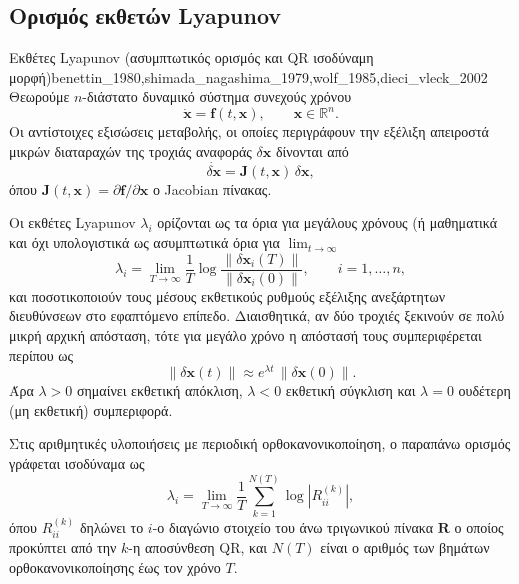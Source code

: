 \documentclass[11pt,a4paper]{report}
\begin{document}
\subsection{Ορισμός εκθετών Lyapunov}

\begin{definitionbox}{Εκθέτες Lyapunov (ασυμπτωτικός ορισμός και QR ισοδύναμη μορφή)}{benettin_1980,shimada_nagashima_1979,wolf_1985,dieci_vleck_2002}
Θεωρούμε $n$-διάστατο δυναμικό σύστημα συνεχούς χρόνου
\begin{equation}
\dot{\mathbf{x}} = \mathbf{f}(t,\mathbf{x}), \qquad \mathbf{x}\in\mathbb{R}^n .
\end{equation}
Οι αντίστοιχες εξισώσεις μεταβολής, οι οποίες περιγράφουν την εξέλιξη απειροστά μικρών διαταραχών της τροχιάς αναφοράς $\delta\mathbf{x}$ δίνονται από
\begin{equation}
\dot{\delta\mathbf{x}} = \mathbf{J}(t,\mathbf{x})\,\delta\mathbf{x},
\end{equation}
όπου $\mathbf{J}(t,\mathbf{x}) = \partial \mathbf{f}/\partial \mathbf{x}$ ο Jacobian πίνακας.

Οι εκθέτες Lyapunov $\lambda_i$ ορίζονται ως τα όρια για μεγάλους χρόνους (ή μαθηματικά και όχι υπολογιστικά ως ασυμπτωτικά όρια για $\lim_{t \to \infty}$
\begin{equation}
\lambda_i =
\lim_{T\to\infty}
\frac{1}{T}
\log
\frac{\|\delta\mathbf{x}_i(T)\|}{\|\delta\mathbf{x}_i(0)\|},
\qquad i=1,\dots,n ,
\end{equation}
και ποσοτικοποιούν τους μέσους εκθετικούς ρυθμούς εξέλιξης ανεξάρτητων διευθύνσεων στο εφαπτόμενο επίπεδο.
Διαισθητικά, αν δύο τροχιές ξεκινούν σε πολύ μικρή αρχική απόσταση,
τότε για μεγάλο χρόνο η απόστασή τους συμπεριφέρεται περίπου ως
\begin{equation}
\|\delta \mathbf{x}(t)\|\approx e^{\lambda t}\,\|\delta \mathbf{x}(0)\|.
\end{equation}
Άρα $\lambda>0$ σημαίνει εκθετική απόκλιση, $\lambda<0$ εκθετική σύγκλιση και $\lambda=0$ ουδέτερη (μη εκθετική) συμπεριφορά.

Στις αριθμητικές υλοποιήσεις με περιοδική ορθοκανονικοποίηση, ο παραπάνω ορισμός γράφεται ισοδύναμα ως
\begin{equation}
\lambda_i =
\lim_{T\to\infty}
\frac{1}{T}
\sum_{k=1}^{N(T)} \log \left| R^{(k)}_{ii} \right|,
\end{equation}
όπου $R^{(k)}_{ii}$ δηλώνει το $i$-ο διαγώνιο στοιχείο του άνω τριγωνικού πίνακα $\mathbf{R}$ ο οποίος προκύπτει από την $k$-η αποσύνθεση QR, και $N(T)$ είναι ο αριθμός των βημάτων ορθοκανονικοποίησης έως τον χρόνο $T$.
\end{definitionbox}
\end{document}
